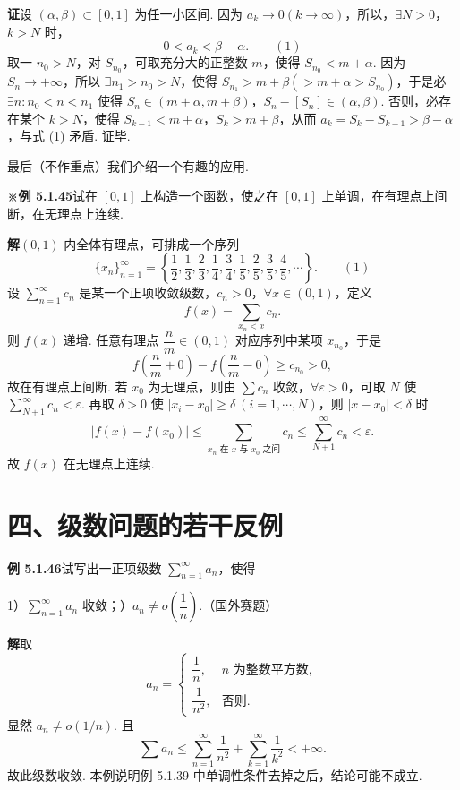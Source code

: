 \documentclass[UTF8, 12pt, fontset=fandol, oneside]{ctexart}
\begin{document}
\noindent\textbf{证}\quad 设 $(\alpha,\beta)\subset[0,1]$ 为任一小区间. 因为 $a_k\to0(k\to\infty)$，所以，$\exists N>0$，$k>N$ 时，
\[
  0<a_k<\beta-\alpha.
\qquad(1)
\]
取一 $n_0>N$，对 $S_{n_0}$，可取充分大的正整数 $m$，使得 $S_{n_0}<m+\alpha$. 因为 $S_n\to+\infty$，所以 $\exists n_1>n_0>N$，使得 $S_{n_1}>m+\beta(>m+\alpha>S_{n_0})$，于是必 $\exists n:n_0<n<n_1$ 使得 $S_n\in(m+\alpha,m+\beta)$，$S_n-[S_n]\in(\alpha,\beta)$. 否则，必存在某个 $k>N$，使得 $S_{k-1}<m+\alpha$，$S_k>m+\beta$，从而 $a_k=S_k-S_{k-1}>\beta-\alpha$，与式 (1) 矛盾. 证毕.

最后（不作重点）我们介绍一个有趣的应用.

\noindent\textbf{※例 5.1.45}\quad 试在 $[0,1]$ 上构造一个函数，使之在 $[0,1]$ 上单调，在有理点上间断，在无理点上连续.

\noindent\textbf{解}\quad $(0,1)$ 内全体有理点，可排成一个序列
\[
  \{x_n\}_{n=1}^{\infty}
  =\left\{\frac12,\frac13,\frac23,\frac14,\frac34,
  \frac15,\frac25,\frac35,\frac45,\cdots\right\}.
\qquad(1)
\]
设 $\displaystyle\sum_{n=1}^{\infty}c_n$ 是某一个正项收敛级数，$c_n>0$，$\forall x\in(0,1)$，定义
\[
  f(x)=\sum_{x_n<x}c_n.
\]
则 $f(x)$ 递增. 任意有理点 $\dfrac nm\in(0,1)$ 对应序列中某项 $x_{n_0}$，于是
\[
  f\left(\frac nm+0\right)-f\left(\frac nm-0\right)\ge c_{n_0}>0,
\]
故在有理点上间断. 若 $x_0$ 为无理点，则由 $\sum c_n$ 收敛，$\forall\varepsilon>0$，可取 $N$ 使 $\sum_{N+1}^{\infty}c_n<\varepsilon$. 再取 $\delta>0$ 使 $|x_i-x_0|\ge\delta\ (i=1,\cdots,N)$，则 $|x-x_0|<\delta$ 时
\[
  |f(x)-f(x_0)|
  \le\sum_{x_n\text{ 在 }x\text{ 与 }x_0\text{ 之间}}c_n
  \le\sum_{N+1}^{\infty}c_n<\varepsilon.
\]
故 $f(x)$ 在无理点上连续.

\section*{四、级数问题的若干反例}

\noindent\textbf{例 5.1.46}\quad 试写出一正项级数 $\displaystyle\sum_{n=1}^{\infty}a_n$，使得

1）$\displaystyle\sum_{n=1}^{\infty}a_n$ 收敛；）$a_n\ne o\left(\dfrac1n\right)$.（国外赛题）

\noindent\textbf{解}\quad 取
\[
  a_n=
  \begin{cases}
  \dfrac1n, & n\text{ 为整数平方数},\\[0.4em]
  \dfrac1{n^2}, & \text{否则}.
  \end{cases}
\]
显然 $a_n\ne o(1/n)$. 且
\[
  \sum a_n\le \sum_{n=1}^{\infty}\frac1{n^2}
  +\sum_{k=1}^{\infty}\frac1{k^2}<+\infty.
\]
故此级数收敛. 本例说明例 5.1.39 中单调性条件去掉之后，结论可能不成立.
\end{document}
